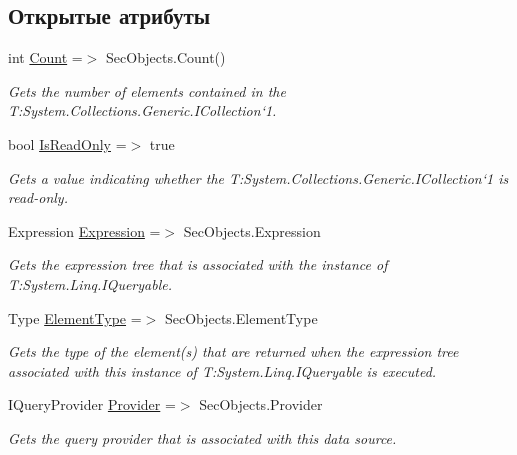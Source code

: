 \subsection*{Открытые атрибуты}
\begin{DoxyCompactItemize}
\item 
int \hyperlink{class_security_1_1_entity_framework_1_1_collections_1_1_sec_object_collection_a16da3215771562a89439c14fe9917c19}{Count} =$>$ Sec\+Objects.\+Count()
\begin{DoxyCompactList}\small\item\em Gets the number of elements contained in the T\+:\+System.\+Collections.\+Generic.\+I\+Collection`1. \end{DoxyCompactList}\item 
bool \hyperlink{class_security_1_1_entity_framework_1_1_collections_1_1_sec_object_collection_a3c9d94cbd97a670d886c39df79276a75}{Is\+Read\+Only} =$>$ true
\begin{DoxyCompactList}\small\item\em Gets a value indicating whether the T\+:\+System.\+Collections.\+Generic.\+I\+Collection`1 is read-\/only. \end{DoxyCompactList}\item 
Expression \hyperlink{class_security_1_1_entity_framework_1_1_collections_1_1_sec_object_collection_a60d45de2ee61976cb4a778bcd7c537a7}{Expression} =$>$ Sec\+Objects.\+Expression
\begin{DoxyCompactList}\small\item\em Gets the expression tree that is associated with the instance of T\+:\+System.\+Linq.\+I\+Queryable. \end{DoxyCompactList}\item 
Type \hyperlink{class_security_1_1_entity_framework_1_1_collections_1_1_sec_object_collection_ae2c93fc6f057b51bf844953bb7cb30c3}{Element\+Type} =$>$ Sec\+Objects.\+Element\+Type
\begin{DoxyCompactList}\small\item\em Gets the type of the element(s) that are returned when the expression tree associated with this instance of T\+:\+System.\+Linq.\+I\+Queryable is executed. \end{DoxyCompactList}\item 
I\+Query\+Provider \hyperlink{class_security_1_1_entity_framework_1_1_collections_1_1_sec_object_collection_a30605924c42e5bf191768f76596bb9c6}{Provider} =$>$ Sec\+Objects.\+Provider
\begin{DoxyCompactList}\small\item\em Gets the query provider that is associated with this data source. \end{DoxyCompactList}\end{DoxyCompactItemize}
